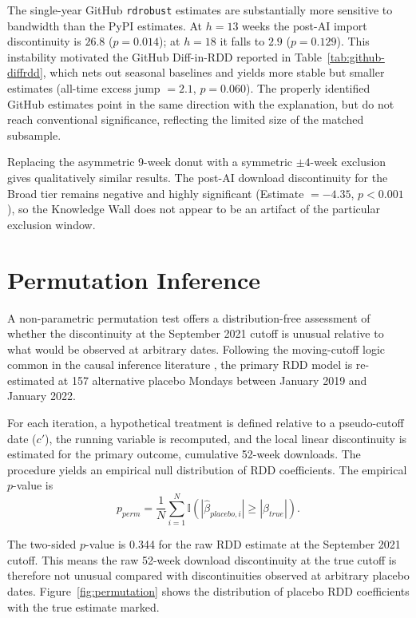 \documentclass[12pt, a4paper]{report}
\begin{document}
The single-year GitHub \texttt{rdrobust} estimates are substantially more sensitive to bandwidth than the PyPI estimates. At $h = 13$ weeks the post-AI import discontinuity is $26.8$ ($p = 0.014$); at $h = 18$ it falls to $2.9$ ($p = 0.129$). This instability motivated the GitHub Diff-in-RDD reported in Table~\ref{tab:github-diffrdd}, which nets out seasonal baselines and yields more stable but smaller estimates (all-time excess jump $= 2.1$, $p = 0.060$). The properly identified GitHub estimates point in the same direction with the explanation, but do not reach conventional significance, reflecting the limited size of the matched subsample.

Replacing the asymmetric 9-week donut with a symmetric $\pm 4$-week exclusion gives qualitatively similar results. The post-AI download discontinuity for the Broad tier remains negative and highly significant (Estimate $= -4.35$, $p < 0.001$), so the Knowledge Wall does not appear to be an artifact of the particular exclusion window.

\chapter{Permutation Inference}\label{app:permutation}

A non-parametric permutation test offers a distribution-free assessment of whether the discontinuity at the September 2021 cutoff is unusual relative to what would be observed at arbitrary dates. Following the moving-cutoff logic common in the causal inference literature \citep{dell2010persistent}, the primary RDD model is re-estimated at 157 alternative placebo Mondays between January 2019 and January 2022.

For each iteration, a hypothetical treatment is defined relative to a pseudo-cutoff date ($c'$), the running variable is recomputed, and the local linear discontinuity is estimated for the primary outcome, cumulative 52-week downloads. The procedure yields an empirical null distribution of RDD coefficients. The empirical $p$-value is
$$p_{perm} = \frac{1}{N} \sum_{i=1}^{N} \mathbb{I}(|\hat{\beta}_{placebo, i}| \geq |\hat{\beta}_{true}|).$$

The two-sided $p$-value is 0.344 for the raw RDD estimate at the September 2021 cutoff. This means the raw 52-week download discontinuity at the true cutoff is therefore not unusual compared with discontinuities observed at arbitrary placebo dates. Figure~\ref{fig:permutation} shows the distribution of placebo RDD coefficients with the true estimate marked.
\end{document}
